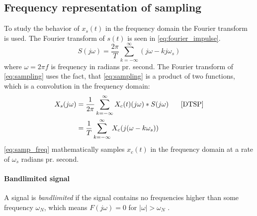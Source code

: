 \subsection{Frequency representation of sampling}
To study the behavior of $x_s(t)$ in the frequency domain the Fourier transform is used. The Fourier transform of $s(t)$ is seen in \eqref{eq:fourier_impulse}.
\begin{equation}\label{eq:fourier_impulse}
S(j\omega)=\frac{2\pi}{T}\sum_{k=-\infty}^{\infty}(j\omega-kj\omega_s)
\end{equation}
where $\omega=2\pi f$ is frequency in radians pr. second.
The Fourier transform of \eqref{eq:sampling} uses the fact, that \eqref{eq:sampling} is a product of two functions, which is a convolution in the frequency domain:
\begin{align}
X_s(j\omega)&=\frac{1}{2\pi}\sum_{k=-\infty}^{\infty}X_c(t)(j\omega)*S(j\omega)\phantom{mm}\text{\cite{DTSP}}\nonumber\\
&=\frac{1}{T}\sum_{k=-\infty}^{\infty}X_c(j(\omega-k\omega_s))\label{eq:samp_freq}
\end{align}
\eqref{eq:samp_freq} mathematically samples $x_c(t)$ in the frequency domain at a rate of $\omega_s$ radians pr. second. 
\paragraph{Bandlimited signal}
A signal is \textit{bandlimited} if the signal contains no frequencies higher than some frequency $\omega_N$, which means $F(j\omega)=0$ for $|\omega|>\omega_N$ \cite{FAA}. 
